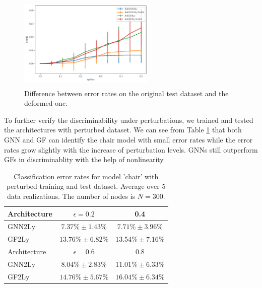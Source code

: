 \begin{figure}[h]
  \centering
  \includegraphics[height=4.5cm,width=6.5cm]{allCostTest_nopenalty.pdf}
\caption{Difference between error rates on the original test dataset and the deformed one. }
\label{fig:sim}
\end{figure}
To further verify the discriminability under perturbations, we trained and tested the architectures with perturbed dataset. We can see from Table \ref{tb:results-perturb} that both GNN and GF can identify the chair model with small error rates while the error rates grow slightly with the increase of perturbation levels. GNNs still outperform GFs in discriminablity with the help of nonlinearity.

\begin{table}[h]
\centering
\begin{tabular}{l|c |c  } \hline
Architecture    & $\epsilon = 0.2$ & 0.4   \\ \hline
GNN2Ly		& $7.37\% \pm 1.43\%$ &  $7.71\% \pm 3.96\%$ \\\hline
GF2Ly	& $13.76\% \pm 6.82\%$  & $13.54\% \pm 7.16\%$  \\ \hline\hline
Architecture    & $\epsilon = 0.6$ & 0.8   \\ \hline
GNN2Ly& $8.04\% \pm 2.83\%$ & $11.01\% \pm 6.33\%$  \\ \hline
GF2Ly	& $14.76\% \pm 5.67\%$ & $16.04\% \pm 6.34\%$ \\ \hline
\end{tabular}
\caption{Classification error rates for model 'chair' with perturbed training and test dataset. Average over 5 data realizations. The number of nodes is $N=300$.}
\label{tb:results-perturb}
\vspace{-3mm}
\end{table} 

